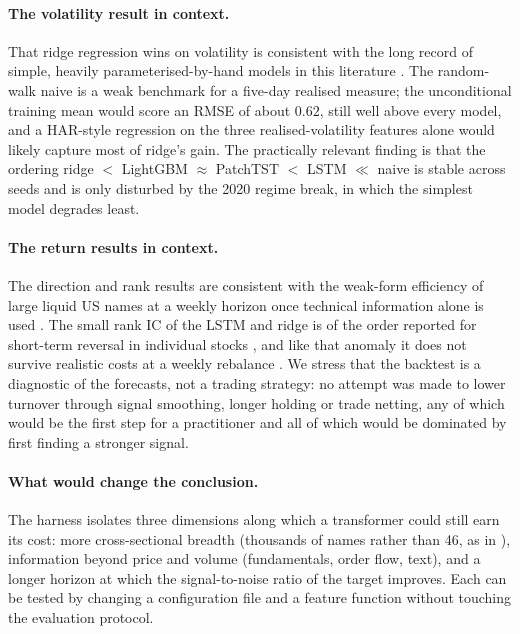 \documentclass[10pt,a4paper,twoside,twocolumn]{article}
\begin{document}
\paragraph{The volatility result in context.} That ridge regression wins on volatility is consistent with the long record of simple, heavily parameterised-by-hand models in this literature \citep{corsi2009simple,hansen2005forecast}. The random-walk naive is a weak benchmark for a five-day realised measure; the unconditional training mean would score an RMSE of about $0.62$, still well above every model, and a HAR-style regression on the three realised-volatility features alone would likely capture most of ridge's gain. The practically relevant finding is that the ordering ridge $<$ LightGBM $\approx$ PatchTST $<$ LSTM $\ll$ naive is stable across seeds and is only disturbed by the 2020 regime break, in which the simplest model degrades least.

\paragraph{The return results in context.} The direction and rank results are consistent with the weak-form efficiency of large liquid US names at a weekly horizon once technical information alone is used \citep{fama1970efficient,welch2008comprehensive}. The small rank IC of the LSTM and ridge is of the order reported for short-term reversal in individual stocks \citep{jegadeesh1990evidence}, and like that anomaly it does not survive realistic costs at a weekly rebalance \citep{novymarx2016taxonomy}. We stress that the backtest is a diagnostic of the forecasts, not a trading strategy: no attempt was made to lower turnover through signal smoothing, longer holding or trade netting, any of which would be the first step for a practitioner and all of which would be dominated by first finding a stronger signal.

\paragraph{What would change the conclusion.} The harness isolates three dimensions along which a transformer could still earn its cost: more cross-sectional breadth (thousands of names rather than 46, as in \citet{gu2020empirical}), information beyond price and volume (fundamentals, order flow, text), and a longer horizon at which the signal-to-noise ratio of the target improves. Each can be tested by changing a configuration file and a feature function without touching the evaluation protocol.
\end{document}
